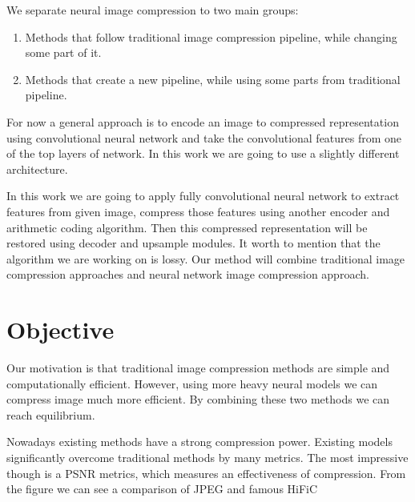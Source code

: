 We separate neural image compression to two main groups:

\begin{enumerate}
    \item Methods that follow traditional image compression pipeline, while changing some part of it.
    \item Methods that create a new pipeline, while using some parts from traditional pipeline.
\end{enumerate}

For now a general approach is to encode an image to compressed representation using convolutional neural network and take the convolutional features from one of the top layers of network. In this work we are going to use a slightly different architecture.

In this work we are going to apply fully convolutional neural network to extract features from given image, compress those features using another encoder and arithmetic coding algorithm. Then this compressed representation will be restored using decoder and upsample modules. It worth to mention that the algorithm we are working on is lossy. Our method will combine traditional image compression approaches and neural network image compression approach.

\chapter{Objective}

Our motivation is that traditional image compression methods are simple and computationally efficient. However, using more heavy neural models we can compress image much more efficient. By combining these two methods we can reach equilibrium.

Nowadays existing methods have a strong compression power. Existing models significantly overcome traditional methods by many metrics. The most impressive though is a PSNR metrics, which measures an effectiveness of compression. From the figure we can see a comparison of JPEG and famous HiFiC \cite{mentzer_high_fidelity_2020}

